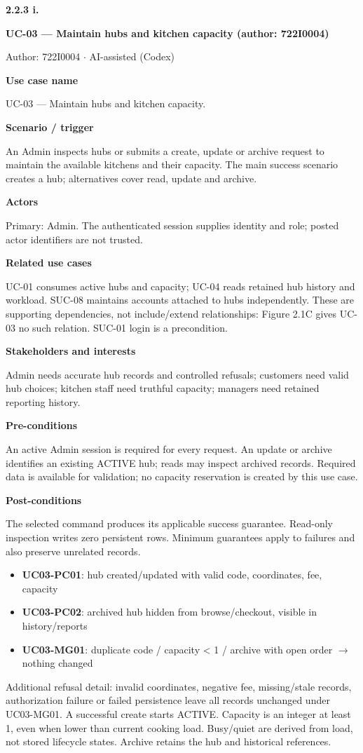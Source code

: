 \textbf{2.2.3 i.}\par
\textbf{UC-03 --- Maintain hubs and kitchen capacity (author: 722I0004)}

Author: 722I0004 \ensuremath{\cdot} AI-assisted (Codex)

\textbf{Use case name}

UC-03 --- Maintain hubs and kitchen capacity.

\textbf{Scenario / trigger}

An Admin inspects hubs or submits a create, update or archive request to maintain the available kitchens and their capacity. The main success scenario creates a hub; alternatives cover read, update and archive.

\textbf{Actors}

Primary: Admin. The authenticated session supplies identity and role; posted actor identifiers are not trusted.

\textbf{Related use cases}

UC-01 consumes active hubs and capacity; UC-04 reads retained hub history and workload. SUC-08 maintains accounts attached to hubs independently. These are supporting dependencies, not include/extend relationships: Figure 2.1C gives UC-03 no such relation. SUC-01 login is a precondition.

\textbf{Stakeholders and interests}

Admin needs accurate hub records and controlled refusals; customers need valid hub choices; kitchen staff need truthful capacity; managers need retained reporting history.

\textbf{Pre-conditions}

An active Admin session is required for every request. An update or archive identifies an existing ACTIVE hub; reads may inspect archived records. Required data is available for validation; no capacity reservation is created by this use case.

\textbf{Post-conditions}

The selected command produces its applicable success guarantee. Read-only inspection writes zero persistent rows. Minimum guarantees apply to failures and also preserve unrelated records.

\begin{itemize}
\item \textbf{UC03-PC01}: hub created/updated with valid code, coordinates, fee, capacity

\item \textbf{UC03-PC02}: archived hub hidden from browse/checkout, visible in history/reports

\item \textbf{UC03-MG01}: duplicate code / capacity \textless{} 1 / archive with open order \ensuremath{\rightarrow} nothing changed

\end{itemize}
Additional refusal detail: invalid coordinates, negative fee, missing/stale records, authorization failure or failed persistence leave all records unchanged under UC03-MG01. A successful create starts ACTIVE. Capacity is an integer at least 1, even when lower than current cooking load. Busy/quiet are derived from load, not stored lifecycle states. Archive retains the hub and historical references.


